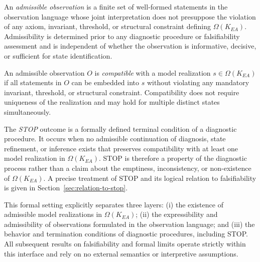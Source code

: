 \begin{definition}
An \emph{admissible observation} is a finite set of well-formed statements in
the observation language whose joint interpretation does not presuppose the
violation of any axiom, invariant, threshold, or structural constraint
defining \(\Omega(K_{EA})\).
Admissibility is determined prior to any diagnostic procedure or
falsifiability assessment and is independent of whether the observation is
informative, decisive, or sufficient for state identification.
\end{definition}

\medskip

\begin{definition}[Compatibility]
An admissible observation \(O\) is \emph{compatible} with a model
realization \(s \in \Omega(K_{EA})\) if all statements in \(O\) can be
embedded into \(s\) without violating any mandatory invariant, threshold,
or structural constraint.
Compatibility does not require uniqueness of the realization and may hold
for multiple distinct states simultaneously.
\end{definition}

\medskip

\begin{remark}
The \emph{STOP} outcome is a formally defined terminal condition of a
diagnostic procedure.
It occurs when no admissible continuation of diagnosis, state refinement,
or inference exists that preserves compatibility with at least one model
realization in \(\Omega(K_{EA})\).
STOP is therefore a property of the diagnostic process rather than a claim
about the emptiness, inconsistency, or non-existence of
\(\Omega(K_{EA})\).
A precise treatment of STOP and its logical relation to falsifiability is
given in Section~\ref{sec:relation-to-stop}.
\end{remark}

\medskip

\begin{remark}
This formal setting explicitly separates three layers:
(i) the existence of admissible model realizations in
\(\Omega(K_{EA})\);
(ii) the expressibility and admissibility of observations formulated in the
observation language; and
(iii) the behavior and termination conditions of diagnostic procedures,
including STOP.
All subsequent results on falsifiability and formal limits operate strictly
within this interface and rely on no external semantics or interpretive
assumptions.
\end{remark}
